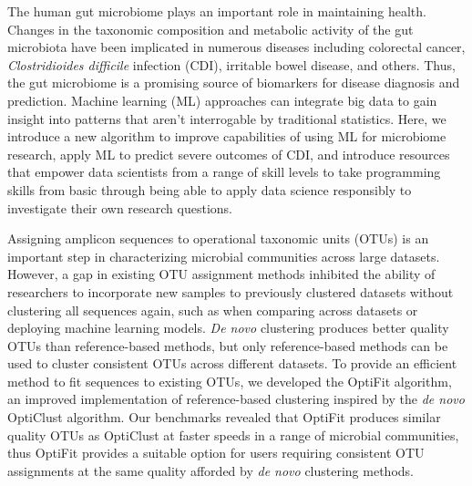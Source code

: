 The human gut microbiome plays an important role in maintaining health.
Changes in the taxonomic composition and metabolic activity of the gut
microbiota have been implicated in numerous diseases including colorectal
cancer, \textit{Clostridioides difficile} infection (CDI), irritable bowel disease,
and others.
Thus, the gut microbiome is a promising source of biomarkers for disease
diagnosis and prediction.
Machine learning (ML) approaches can integrate big data to gain insight into
patterns that aren't interrogable by traditional statistics.
Here, we introduce a new algorithm to improve capabilities of using ML for
microbiome research,
apply ML to predict severe outcomes of CDI,
and introduce resources that empower data scientists from a range of skill
levels to take programming skills from basic through being able to apply data
science responsibly to investigate their own research questions.

Assigning amplicon sequences to operational taxonomic units (OTUs) is an
important step in characterizing microbial communities across large datasets.
However, a gap in existing OTU assignment methods inhibited the ability of
researchers to incorporate new samples to previously clustered datasets without
clustering all sequences again, such as when comparing across datasets or
deploying machine learning models.
\textit{De novo} clustering produces better quality OTUs than reference-based
methods, but only reference-based methods can be used to cluster consistent OTUs
across different datasets.
To provide an efficient method to fit sequences to existing OTUs, we developed
the OptiFit algorithm, an improved implementation of reference-based clustering
inspired by the \textit{de novo} OptiClust algorithm.
Our benchmarks revealed that OptiFit produces similar quality OTUs as OptiClust
at faster speeds in a range of microbial communities, thus OptiFit provides a
suitable option for users requiring consistent OTU assignments at the same
quality afforded by \textit{de novo} clustering methods.

